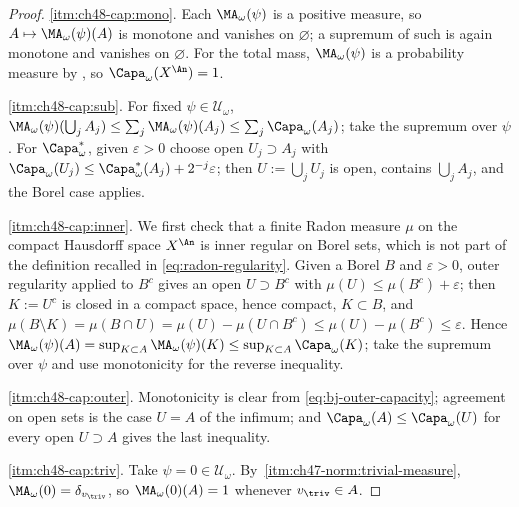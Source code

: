 \begin{proof}
\cref{itm:ch48-cap:mono}.  Each $\MA_\omega(\psi)$ is a positive measure,
so $A\mapsto\MA_\omega(\psi)(A)$ is monotone and vanishes on
$\varnothing$; a supremum of such is again monotone and vanishes on
$\varnothing$.  For the total mass, $\MA_\omega(\psi)$ is a probability
measure by , so
$\Capa_\omega(X^{\An})=1$.

\cref{itm:ch48-cap:sub}.  For fixed $\psi\in\mathcal U_\omega$,
$\MA_\omega(\psi)(\bigcup_jA_j)\le\sum_j\MA_\omega(\psi)(A_j)
\le\sum_j\Capa_\omega(A_j)$; take the supremum over $\psi$.  For
$\Capa^*_\omega$, given $\varepsilon>0$ choose open
$U_j\supset A_j$ with $\Capa_\omega(U_j)\le\Capa^*_\omega(A_j)
+2^{-j}\varepsilon$; then $U:=\bigcup_jU_j$ is open, contains
$\bigcup_jA_j$, and the Borel case applies.

\cref{itm:ch48-cap:inner}.  We first check that a finite Radon measure
$\mu$ on the compact Hausdorff space $X^{\An}$ is inner regular on
Borel sets, which is not part of the definition recalled in
\eqref{eq:radon-regularity}.  Given a Borel $B$ and $\varepsilon>0$,
outer regularity applied to $B^c$ gives an open $U\supset B^c$ with
$\mu(U)\le\mu(B^c)+\varepsilon$; then $K:=U^c$ is closed in a compact
space, hence compact, $K\subset B$, and
$\mu(B\setminus K)=\mu(B\cap U)=\mu(U)-\mu(U\cap B^c)\le
\mu(U)-\mu(B^c)\le\varepsilon$.  Hence
$\MA_\omega(\psi)(A)=\sup_{K\subset A}\MA_\omega(\psi)(K)\le
\sup_{K\subset A}\Capa_\omega(K)$; take the supremum over $\psi$ and use
monotonicity for the reverse inequality.

\cref{itm:ch48-cap:outer}.  Monotonicity is clear from
\eqref{eq:bj-outer-capacity}; agreement on open sets is the case
$U=A$ of the infimum; and $\Capa_\omega(A)\le\Capa_\omega(U)$ for every
open $U\supset A$ gives the last inequality.

\cref{itm:ch48-cap:triv}.  Take $\psi=0\in\mathcal U_\omega$.  By
\,\cref{itm:ch47-norm:trivial-measure},
$\MA_\omega(0)=\delta_{v_{\triv}}$, so
$\MA_\omega(0)(A)=1$ whenever $v_{\triv}\in A$.


\end{proof}
